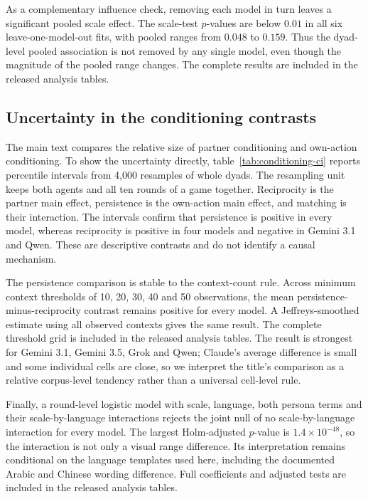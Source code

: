 \documentclass[11pt,a4paper]{article}
\begin{document}
As a complementary influence check, removing each model in turn leaves a significant pooled scale effect. The scale-test $p$-values are below $0.01$ in all six leave-one-model-out fits, with pooled ranges from $0.048$ to $0.159$. Thus the dyad-level pooled association is not removed by any single model, even though the magnitude of the pooled range changes. The complete results are included in the released analysis tables.

\subsection{Uncertainty in the conditioning contrasts}\label{appendix:conditioning_ci}

The main text compares the relative size of partner conditioning and own-action conditioning. To show the uncertainty directly, table~\ref{tab:conditioning-ci} reports percentile intervals from 4,000 resamples of whole dyads. The resampling unit keeps both agents and all ten rounds of a game together. Reciprocity is the partner main effect, persistence is the own-action main effect, and matching is their interaction. The intervals confirm that persistence is positive in every model, whereas reciprocity is positive in four models and negative in Gemini 3.1 and Qwen. These are descriptive contrasts and do not identify a causal mechanism.

The persistence comparison is stable to the context-count rule. Across minimum context thresholds of 10, 20, 30, 40 and 50 observations, the mean persistence-minus-reciprocity contrast remains positive for every model. A Jeffreys-smoothed estimate using all observed contexts gives the same result. The complete threshold grid is included in the released analysis tables. The result is strongest for Gemini 3.1, Gemini 3.5, Grok and Qwen; Claude's average difference is small and some individual cells are close, so we interpret the title's comparison as a relative corpus-level tendency rather than a universal cell-level rule.

Finally, a round-level logistic model with scale, language, both persona terms and their scale-by-language interactions rejects the joint null of no scale-by-language interaction for every model. The largest Holm-adjusted $p$-value is $1.4\times10^{-48}$, so the interaction is not only a visual range difference. Its interpretation remains conditional on the language templates used here, including the documented Arabic and Chinese wording difference. Full coefficients and adjusted tests are included in the released analysis tables.
\end{document}
